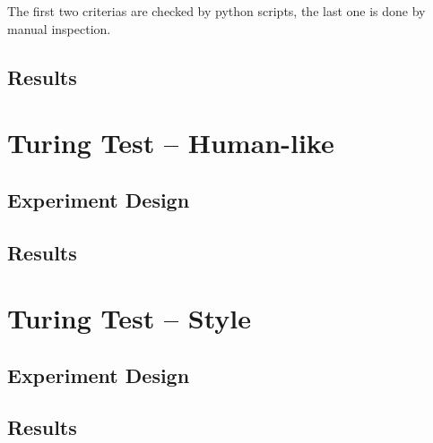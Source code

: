 The first two criterias are checked by python scripts, the last one is done by manual inspection.


\subsection{Results}

\section{Turing Test -- Human-like}
\subsection{Experiment Design}

\subsection{Results}

\section{Turing Test -- Style}
\subsection{Experiment Design}

\subsection{Results}

